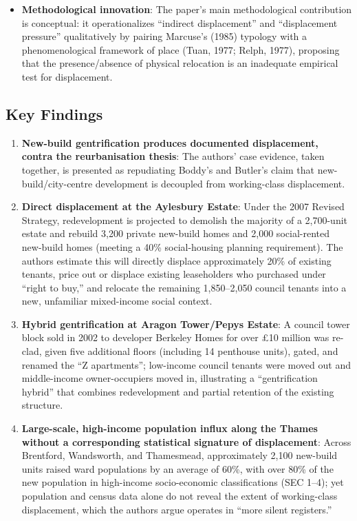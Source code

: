 \begin{itemize}
  \item \textbf{Methodological innovation}: The paper's main methodological contribution is conceptual: it operationalizes ``indirect displacement'' and ``displacement pressure'' qualitatively by pairing Marcuse's (1985) typology with a phenomenological framework of place (Tuan, 1977; Relph, 1977), proposing that the presence/absence of physical relocation is an inadequate empirical test for displacement.
\end{itemize}

\subsection*{Key Findings}

\begin{enumerate}
  \item \textbf{New-build gentrification produces documented displacement, contra the reurbanisation thesis}: The authors' case evidence, taken together, is presented as repudiating Boddy's and Butler's claim that new-build/city-centre development is decoupled from working-class displacement.
  \item \textbf{Direct displacement at the Aylesbury Estate}: Under the 2007 Revised Strategy, redevelopment is projected to demolish the majority of a 2,700-unit estate and rebuild 3,200 private new-build homes and 2,000 social-rented new-build homes (meeting a 40\% social-housing planning requirement). The authors estimate this will directly displace approximately 20\% of existing tenants, price out or displace existing leaseholders who purchased under ``right to buy,'' and relocate the remaining 1,850--2,050 council tenants into a new, unfamiliar mixed-income social context.
  \item \textbf{Hybrid gentrification at Aragon Tower/Pepys Estate}: A council tower block sold in 2002 to developer Berkeley Homes for over \pounds10 million was re-clad, given five additional floors (including 14 penthouse units), gated, and renamed the ``Z apartments''; low-income council tenants were moved out and middle-income owner-occupiers moved in, illustrating a ``gentrification hybrid'' that combines redevelopment and partial retention of the existing structure.
  \item \textbf{Large-scale, high-income population influx along the Thames without a corresponding statistical signature of displacement}: Across Brentford, Wandsworth, and Thamesmead, approximately 2,100 new-build units raised ward populations by an average of 60\%, with over 80\% of the new population in high-income socio-economic classifications (SEC 1--4); yet population and census data alone do not reveal the extent of working-class displacement, which the authors argue operates in ``more silent registers.''

\end{enumerate}
